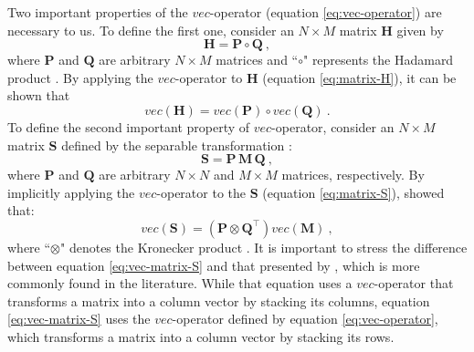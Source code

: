 Two important properties of the $vec$-operator (equation \ref{eq:vec-operator}) 
are necessary to us. 
To define the first one, consider an 
$N \times M$ matrix $\mathbf{H}$ given by
\begin{equation}
\mathbf{H} = \mathbf{P} \circ \mathbf{Q} \: ,
\label{eq:matrix-H}
\end{equation}
where $\mathbf{P}$ and $\mathbf{Q}$ are arbitrary $N \times M$ matrices and 
``$\circ$" represents the Hadamard product \citep[][ p. 298]{horn_johnson1991}.
By applying the $vec$-operator to $\mathbf{H}$ (equation \ref{eq:matrix-H}), 
it can be shown that
\begin{equation}
vec \left( \mathbf{H} \right) = 
vec \left( \mathbf{P} \right) \circ vec \left( \mathbf{Q} \right) \: .
\label{eq:vec-matrix-H}
\end{equation}
To define the second important property of $vec$-operator, 
consider an $N \times M$ matrix $\mathbf{S}$ defined by 
the separable transformation \citet[][ p. 31]{jain1989}:
\begin{equation}
\mathbf{S} = \mathbf{P \, M \, Q} \: ,
\label{eq:matrix-S}
\end{equation}
where $\mathbf{P}$ and $\mathbf{Q}$ are arbitrary $N \times N$ and $M \times M$ 
matrices, respectively.
By implicitly applying the $vec$-operator to 
the $\mathbf{S}$ (equation \ref{eq:matrix-S}), 
\citet[][ p. 31]{jain1989} showed that:
\begin{equation}
vec \left( \mathbf{S} \right) = 
\left( \mathbf{P} \otimes \mathbf{Q}^{\top} \right) 
vec \left( \mathbf{M} \right) \: ,
\label{eq:vec-matrix-S}
\end{equation}
where ``$\otimes$" denotes the Kronecker product \citep{neudecker1969}.
It is important to stress the difference between equation \ref{eq:vec-matrix-S}
and that presented by \citet{neudecker1969}, which is more commonly found in 
the literature.
While that equation uses a $vec$-operator that transforms a matrix into a column 
vector by stacking its columns, equation \ref{eq:vec-matrix-S} 
uses the $vec$-operator defined by equation \ref{eq:vec-operator}, which 
transforms a matrix into a column vector by stacking its rows.

